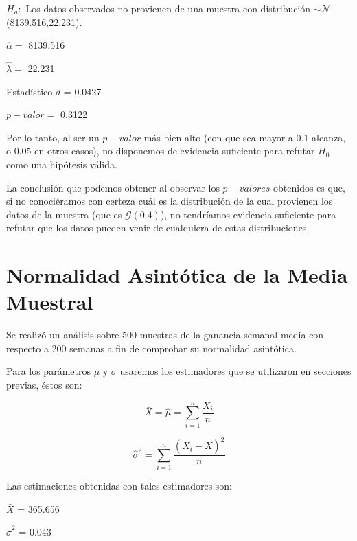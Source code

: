 \documentclass[a4paper,10pt]{article}
\begin{document}
\noindent$H_a:$ Los datos observados no provienen de una muestra con distribución $\sim \mathcal{N}$(8139.516,22.231).
\vspace{0.2in}

\noindent$\hat{\alpha} =$ 8139.516
\vspace{0.2in}

\noindent$\hat{\lambda} =$ 22.231
\vspace{0.2in}

\noindent Estadístico $d$ = 0.0427
\vspace{0.2in}

\noindent$p-valor =$ 0.3122
\vspace{0.2in}

Por lo tanto, al ser un $p-valor$ más bien alto (con que sea mayor a 0.1 alcanza, o 0.05 en otros casos), no disponemos de evidencia suficiente para
refutar $H_0$ como una hipótesis válida.


La conclusión que podemos obtener al observar los $p-valores$ obtenidos es que, si no conociéramos con certeza cuál es la distribución
de la cual provienen los datos de la muestra (que es $\mathcal{G}(0.4)$), no tendríamos evidencia suficiente para refutar que los datos
pueden venir de cualquiera de estas distribuciones.

\pagebreak

\section*{Normalidad Asintótica de la Media Muestral}

Se realizó un análisis sobre 500 muestras de la ganancia semanal media
con respecto a 200 semanas a fin de comprobar su normalidad asintótica.

Para los parámetros $\mu$ y $\sigma$ usaremos los estimadores que se utilizaron en secciones previas, éstos son:

\vspace{0.4in}

\[\bar{X} = \hat{\mu} = \sum\limits_{i=1}^n \frac{X_i}{n}\]


\[\hat{\sigma}^2 = \sum\limits_{i=1}^n \frac{(X_i - \bar{X})^2}{n}\]

\vspace{0.4in}
Las estimaciones obtenidas con tales estimadores son:
\vspace{0.4in}


$\bar{X}$ = 365.656

\vspace{0.1in}
$\hat{\sigma}^2$ = 0.043
\end{document}
